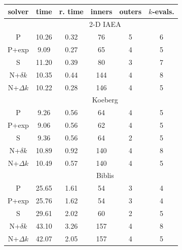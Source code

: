 \begin{table}[!] 

 \begin{center} 
 
 \begin{threeparttable}
 \begin{tabular}{cccccc} 
 \toprule 
  solver & time\tnote{f}  & r. time\tnote{g} & inners & outers & $k$-evals. \\
 \midrule 
 &  \multicolumn{5}{c}{2-D IAEA} \\ 
 \midrule 
    P\tnote{a}        &     10.26 &      0.32 &           76 &            5 &            6 \\ 
    P+exp\tnote{b} &      9.09 &      0.27 &           65 &            4 &            5 \\ 
    S\tnote{c} &     11.20 &      0.39 &           80 &            3 &            7 \\ 
  N+$\delta k$\tnote{d} &     10.35 &      0.44 &          144 &            4 &            8 \\ 
  N+$\Delta k$\tnote{e} &     10.22 &      0.28 &          146 &            4 &            5 \\ 
 \midrule 
 &  \multicolumn{5}{c}{Koeberg} \\ 
 \midrule 
        P &      9.26 &      0.56 &           64 &            4 &            5 \\ 
    P+exp &      9.06 &      0.56 &           62 &            4 &            5 \\ 
    S &      9.36 &      0.56 &           64 &            2 &            5 \\ 
  N+$\delta k$ &     10.89 &      0.92 &          140 &            4 &            8 \\ 
  N+$\Delta k$ &     10.49 &      0.57 &          140 &            4 &            5 \\ 
 \midrule 
 &  \multicolumn{5}{c}{Biblis} \\ 
 \midrule 
    P &     25.65 &      1.61 &           54 &            3 &            4 \\ 
    P+exp &     25.76 &      1.62 &           54 &            3 &            4 \\ 
    S &     29.61 &      2.02 &           60 &            2 &            5 \\ 
  N+$\delta k$ &     43.10 &      3.26 &          157 &            4 &            8 \\ 
  N+$\Delta k$ &     42.07 &      2.05 &          157 &            4 &            5 \\ 

\end{tabular}
\end{threeparttable}
\end{center}
\end{table}
